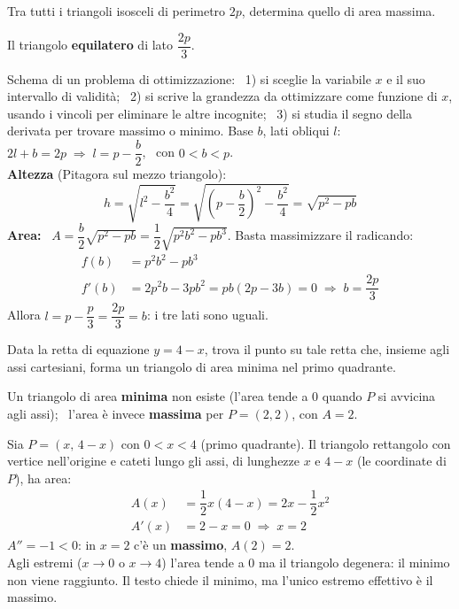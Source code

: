 \begin{question}[ID=3.3, subtitle={Triangolo isoscele di perimetro $2p$ e area massima}, tags={ottimizzazione, geometria}, difficulty=media]
Tra tutti i triangoli isosceli di perimetro \(2p\), determina quello di area massima.
\begin{solution}
Il triangolo \textbf{equilatero} di lato $\dfrac{2p}{3}$.
\end{solution}
\begin{explanation}
Schema di un problema di ottimizzazione: \ 1) si sceglie la variabile $x$ e il suo intervallo di validità; \ 2) si scrive la grandezza da ottimizzare come funzione di $x$, usando i vincoli per eliminare le altre incognite; \ 3) si studia il segno della derivata per trovare massimo o minimo.
Base $b$, lati obliqui $l$: \ $2l+b=2p \;\Rightarrow\; l=p-\dfrac b2$, \ con $0<b<p$. \\
\textbf{Altezza} (Pitagora sul mezzo triangolo):
\[ h=\sqrt{l^2-\dfrac{b^2}{4}}=\sqrt{\left(p-\dfrac b2\right)^2-\dfrac{b^2}{4}}=\sqrt{p^2-pb} \]
\textbf{Area:} \ $A=\dfrac b2\sqrt{p^2-pb}=\dfrac12\sqrt{p^2b^2-pb^3}$. Basta massimizzare il radicando:
\[\begin{aligned}
f(b) &= p^2b^2-pb^3\\
f'(b) &= 2p^2b-3pb^2=pb(2p-3b)=0 \;\Rightarrow\; b=\dfrac{2p}{3}
\end{aligned}\]
Allora $l=p-\dfrac p3=\dfrac{2p}{3}=b$: i tre lati sono uguali.
\end{explanation}
\end{question}


\begin{question}[ID=3.4, subtitle={Punto sulla retta $y=4-x$ che forma triangolo di area minima con gli assi}, tags={ottimizzazione, geometria}, difficulty=media]
Data la retta di equazione \(y = 4 - x\), trova il punto su tale retta che, insieme agli assi cartesiani, forma un triangolo di area minima nel primo quadrante.
\begin{solution}
Un triangolo di area \textbf{minima} non esiste (l'area tende a $0$ quando $P$ si avvicina agli assi); \ l'area è invece \textbf{massima} per $P=(2,2)$, con $A=2$.
\end{solution}
\begin{explanation}
Sia $P=(x,\,4-x)$ con $0<x<4$ (primo quadrante). Il triangolo rettangolo con vertice nell'origine e cateti lungo gli assi, di lunghezze $x$ e $4-x$ (le coordinate di $P$), ha area:
\[\begin{aligned}
A(x) &= \dfrac12x(4-x)=2x-\dfrac12x^2\\
A'(x) &= 2-x=0 \;\Rightarrow\; x=2
\end{aligned}\]
$A''=-1<0$: in $x=2$ c'è un \textbf{massimo}, $A(2)=2$. \\
Agli estremi ($x\to0$ o $x\to4$) l'area tende a $0$ ma il triangolo degenera: il minimo non viene raggiunto. Il testo chiede il minimo, ma l'unico estremo effettivo è il massimo.
\end{explanation}
\end{question}

